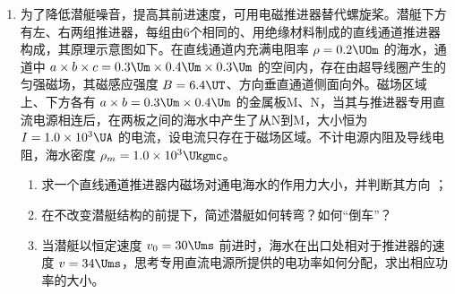 \documentclass[\gkver]{gaokaozhenti}
\begin{document}
\begin{enumerate}
{（2）据题意，电子在电场力作用下做圆周运动，考虑轨道上的电场强度 $E$ 大小相同，有：

$eE=m\frac{v^{2}}{R}$，

$E_{k0}=\frac{1}{2}mv^{2}$，

$R=\frac{R_{A}+R_{B}}{2}$，

联立解得：

$E=\frac{2E_{k0}}{eR}=\frac{4E_{k0}}{e(R_{A}+R_{B})}$。

（3）电子运动时只有电场力做功，根据动能定理，有

$\Delta E_{k}=qU$，

对到达 N 板左边缘的电子，电场力做正功，动能增加，有

$\Delta E_{k\text{左}}=e(\varphi_{B}-\varphi_{C})$。

对到达 N 板右边缘的电子，电场力做负功，动能减少，有

$\Delta E_{k\text{右}}=e(\varphi_{A}-\varphi_{C})$。

（4）根据电场线特点，等势面 B 与 C 之间的电场强度大于 C 与 A 之间的电场强度，考虑到等势面间距相等，有

$|\varphi_{B}-\varphi_{C}|>|\varphi_{A}-\varphi_{C}|$，

即

$|\Delta E_{k\text{左}}|>|\Delta E_{k\text{右}}|$。
}

\item
为了降低潜艇噪音，提高其前进速度，可用电磁推进器替代螺旋桨。潜艇下方有左、右两组推进器，每组由6个相同的、用绝缘材料制成的直线通道推进器构成，其原理示意图如下。在直线通道内充满电阻率 $\rho=0.2\UOm$ 的海水，通道中 $a\times b\times c=0.3\Um\times0.4\Um\times0.3\Um$ 的空间内，存在由超导线圈产生的匀强磁场，其磁感应强度 $B=6.4\UT$、方向垂直通道侧面向外。磁场区域上、下方各有 $a\times b=0.3\Um\times0.4\Um$ 的金属板M、N，当其与推进器专用直流电源相连后，在两板之间的海水中产生了从N到M，大小恒为 $I=1.0\times10^{3}\UA$ 的电流，设电流只存在于磁场区域。不计电源内阻及导线电阻，海水密度 $\rho_{m}=1.0\times10^{3}\Ukgmc$。
\begin{enumerate}
	\item
	求一个直线通道推进器内磁场对通电海水的作用力大小，并判断其方向 ；
	\item
	在不改变潜艇结构的前提下，简述潜艇如何转弯？如何“倒车”？
	\item
	当潜艇以恒定速度 $v_{0}=30\Ums$ 前进时，海水在出口处相对于推进器的速度 $v=34\Ums$，思考专用直流电源所提供的电功率如何分配，求出相应功率的大小。
\end{enumerate}


\end{enumerate}
\end{document}
